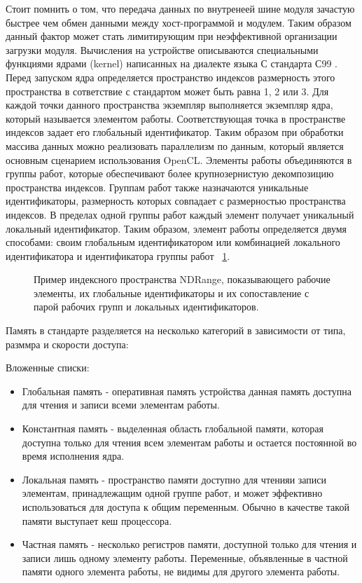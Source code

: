 Стоит помнить о том, что передача данных по внутренеей шине модуля зачастую быстрее чем обмен данными между хост-программой и модулем. Таким образом данный фактор может стать лимитирующим при неэффективной организации загрузки модуля. Вычисления на устройстве описываются специальными функциями ядрами (kernel) написанных на диалекте языка С стандарта С99 \cite{Kernighan1988, ISO:C99}. Перед запуском ядра определяется пространство индексов размерность этого пространства в сответствие с стандартом может быть равна 1, 2 или 3. Для каждой точки данного пространства экземпляр выполняется экземпляр ядра, который называется элементом работы. Соответствующая точка в пространстве индексов задает его глобальный идентификатор. Таким образом при обработки массива данных можно реализовать параллелизм по данным, который является основным сценарием использования OpenCL. Элементы работы объединяются в группы работ, которые обеспечивают более крупнозернистую  декомпозицию пространства индексов. Группам работ также назначаются уникальные идентификаторы, размерность которых совпадает с размерностью пространства индексов. В пределах  одной группы работ каждый элемент получает уникальный локальный идентификатор. Таким образом, элемент работы определяется двумя способами: своим глобальным идентификатором или комбинацией локального идентификатора и идентификатора группы работ ~\ref{fig:ndrange}.
\begin{figure}[ht]
  \caption{Пример индексного пространства NDRange, показывающего рабочие элементы, их глобальные идентификаторы и их сопоставление с парой рабочих групп и локальных идентификаторов.}\label{fig:ndrange}
\end{figure}


Память в стандарте разделяется на несколько категорий в зависимости от типа, разммра и скорости доступа:

\noindent Вложенные списки:
\begin{itemize}
  \item Глобальная память - оперативная память устройства данная память доступна для чтения и записи всеми элементам работы.
  \item Константная память - выделенная область  глобальной  памяти, которая  доступна только для чтения всем элементам работы и остается постоянной во время исполнения ядра.
  \item Локальная память - пространство памяти доступно для чтенияи записи элементам, принадлежащим одной группе работ, и может эффективно использоваться для доступа к общим переменным. Обычно в качестве такой памяти выступает кеш процессора.
  \item Частная память - несколько регистров памяти, доступной только для чтения и записи лишь одному элементу работы. Переменные, объявленные в частной памяти одного элемента работы, не видимы для другого элемента работы.
\end{itemize}


